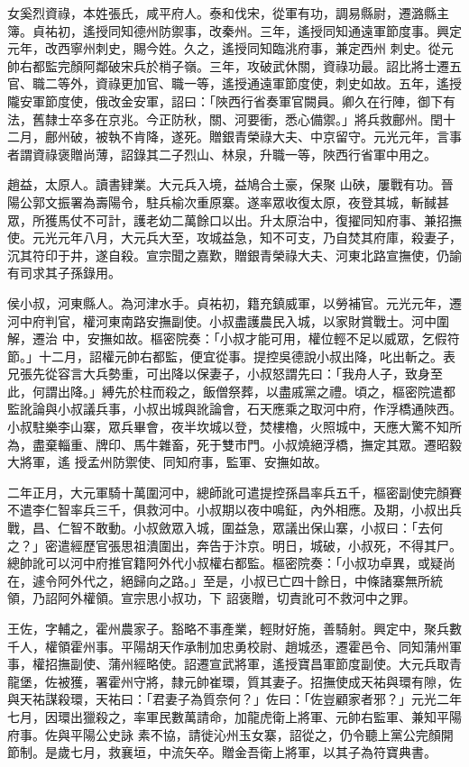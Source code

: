 \begin{pinyinscope}
 女奚烈資祿，本姓張氏，咸平府人。泰和伐宋，從軍有功，調易縣尉，遷潞縣主簿。貞祐初，遙授同知德州防禦事，改秦州。三年，遙授同知通遠軍節度事。興定元年，改西寧州刺史，賜今姓。久之，遙授同知臨洮府事，兼定西州
 刺史。從元帥右都監完顏阿鄰破宋兵於梢子嶺。三年，攻破武休關，資祿功最。詔比將士遷五官、職二等外，資祿更加官、職一等，遙授通遠軍節度使，刺史如故。五年，遙授隴安軍節度使，俄改金安軍，詔曰：「陜西行省奏軍官闕員。卿久在行陣，御下有法，舊隸士卒多在京兆。今正防秋，關、河要衝，悉心備禦。」將兵救鄜州。閏十二月，鄜州破，被執不肯降，遂死。贈銀青榮祿大夫、中京留守。元光元年，言事者謂資祿褒贈尚薄，詔錄其二子烈山、林泉，升職一等，陜西行省軍中用之。



 趙益，太原人。讀書肄業。大元兵入境，益鳩合土豪，保聚
 山硤，屢戰有功。晉陽公郭文振署為壽陽令，駐兵榆次重原寨。遂率眾收復太原，夜登其城，斬馘甚眾，所獲馬仗不可計，護老幼二萬餘口以出。升太原治中，復擢同知府事、兼招撫使。元光元年八月，大元兵大至，攻城益急，知不可支，乃自焚其府庫，殺妻子，沉其符印于井，遂自殺。宣宗聞之嘉歎，贈銀青榮祿大夫、河東北路宣撫使，仍諭有司求其子孫錄用。



 侯小叔，河東縣人。為河津水手。貞祐初，籍充鎮威軍，以勞補官。元光元年，遷河中府判官，權河東南路安撫副使。小叔盡護農民入城，以家財賞戰士。河中圍解，遷治
 中，安撫如故。樞密院奏：「小叔才能可用，權位輕不足以威眾，乞假符節。」十二月，詔權元帥右都監，便宜從事。提控吳德說小叔出降，叱出斬之。表兄張先從容言大兵勢重，可出降以保妻子，小叔怒謂先曰：「我舟人子，致身至此，何謂出降。」縛先於柱而殺之，飯僧祭葬，以盡戚黨之禮。頃之，樞密院遣都監訛論與小叔議兵事，小叔出城與訛論會，石天應乘之取河中府，作浮橋通陜西。小叔駐樂李山寨，眾兵畢會，夜半坎城以登，焚樓櫓，火照城中，天應大驚不知所為，盡棄輜重、牌印、馬牛雜畜，死于雙市門。小叔燒絕浮橋，撫定其眾。遷昭毅大將軍，遙
 授孟州防禦使、同知府事，監軍、安撫如故。



 二年正月，大元軍騎十萬圍河中，總師訛可遣提控孫昌率兵五千，樞密副使完顏賽不遣李仁智率兵三千，俱救河中。小叔期以夜中鳴鉦，內外相應。及期，小叔出兵戰，昌、仁智不敢動。小叔斂眾入城，圍益急，眾議出保山寨，小叔曰：「去何之？」密遣經歷官張思祖潰圍出，奔告于汴京。明日，城破，小叔死，不得其尸。總帥訛可以河中府推官籍阿外代小叔權右都監。樞密院奏：「小叔功卓異，或疑尚在，遽令阿外代之，絕歸向之路。」至是，小叔已亡四十餘日，中條諸寨無所統領，乃詔阿外權領。宣宗思小叔功，下
 詔褒贈，切責訛可不救河中之罪。



 王佐，字輔之，霍州農家子。豁略不事產業，輕財好施，善騎射。興定中，聚兵數千人，權領霍州事。平陽胡天作承制加忠勇校尉、趙城丞，遷霍邑令、同知蒲州軍事，權招撫副使、蒲州經略使。詔遷宣武將軍，遙授寶昌軍節度副使。大元兵取青龍堡，佐被獲，署霍州守將，隸元帥崔環，質其妻子。招撫使成天祐與環有隙，佐與天祐謀殺環，天祐曰：「君妻子為質奈何？」佐曰：「佐豈顧家者邪？」元光二年七月，因環出獵殺之，率軍民數萬請命，加龍虎衛上將軍、元帥右監軍、兼知平陽府事。佐與平陽公史詠
 素不協，請徙沁州玉女寨，詔從之，仍令聽上黨公完顏開節制。是歲七月，救襄垣，中流矢卒。贈金吾衛上將軍，以其子為符寶典書。




\end{pinyinscope}
